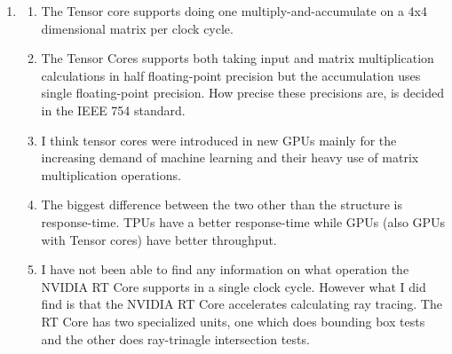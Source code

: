 \documentclass[a4paper, 12pt]{article}
\begin{document}
\begin{enumerate}
	\item
	\begin{enumerate}[label=\arabic*.]
		\item The Tensor core supports doing one multiply-and-accumulate on a 4x4 dimensional matrix per clock cycle.
		
		\item The Tensor Cores supports both taking input and matrix multiplication calculations in half floating-point precision but the accumulation uses single floating-point precision. How precise these precisions are, is decided in the IEEE 754 standard.
		
		\item I think tensor cores were introduced in new GPUs mainly for the increasing demand of machine learning and their heavy use of matrix multiplication operations.
		
		
		
		\item The biggest difference between the two other than the structure is response-time. TPUs have a better response-time while GPUs (also GPUs with Tensor cores) have better throughput.
		
		

		\item I have not been able to find any information on what operation the NVIDIA RT Core supports in a single clock cycle. However what I did find is that the NVIDIA RT Core accelerates calculating ray tracing. The RT Core has two specialized units, one which does bounding box tests and the other does ray-trinagle intersection tests.
	\end{enumerate}


\end{enumerate}
\end{document}
